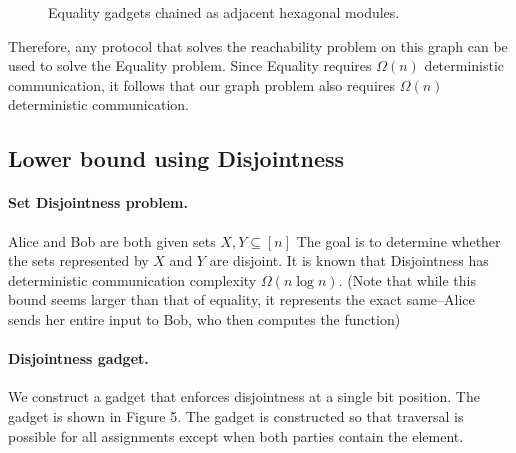 \begin{figure}[h]
\centering
{}

\caption{Equality gadgets chained as adjacent hexagonal modules.}
\end{figure}

Therefore, any protocol that solves the reachability problem on this graph can be used to solve the Equality problem. Since Equality requires $\Omega(n)$ deterministic communication, it follows that our graph problem also requires $\Omega(n)$ deterministic communication.


\subsection{Lower bound using Disjointness}

\paragraph{Set Disjointness problem.}
Alice and Bob are both given sets $X, Y \subseteq [n]$
The goal is to determine whether the sets represented by $X$ and $Y$ are disjoint. It is known that Disjointness has deterministic communication complexity $\Omega(n \log n)$. (Note that while this bound seems larger than that of equality, it represents the exact same--Alice sends her entire input to Bob, who then computes the function)

\paragraph{Disjointness gadget.}
We construct a gadget that enforces disjointness at a single bit position. The gadget is shown in Figure 5. The gadget is constructed so that traversal is possible for all assignments except when both parties contain the element.


